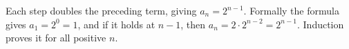 Each step doubles the preceding term, giving $\boxed{a_n=2^{n-1}}$. Formally the formula gives $ a_1=2^0=1 $, and if it holds at $ n-1 $, then $ a_n=2\cdot2^{n-2}=2^{n-1}$. Induction proves it for all positive $ n $.
